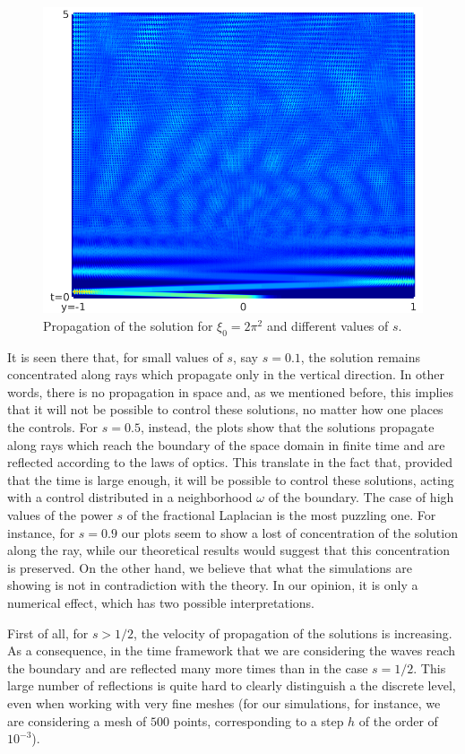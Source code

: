 \documentclass[10pt]{article}
\begin{document}
\begin{figure}[!h]
\begin{minipage}{0.3\textwidth}
		\includegraphics[scale=0.35]{./figures/plot_frac_schrodinger1_09_1}
	\end{minipage}	
	\caption{Propagation of the solution for $\xi_0 = 2\pi^2$ and different values of $s$.}\label{plot_01}
\end{figure} 

It is seen there that, for small values of $s$, say $s=0.1$, the solution remains concentrated along rays which propagate only in the vertical direction. In other words, there is no propagation in space and, as we mentioned before, this implies that it will not be possible to control these solutions, no matter how one places the controls. For $s=0.5$, instead, the plots show that the solutions propagate along rays which reach the boundary of the space domain in finite time and are reflected according to the laws of optics. This translate in the fact that, provided that the time is large enough, it will be possible to control these solutions, acting  with a control distributed in a neighborhood $\omega$ of the boundary. The case of high values of the power $s$ of the fractional Laplacian is the most puzzling one. For instance, for $s=0.9$ our plots seem to show a lost of concentration of the solution along the ray, while our theoretical results would suggest that this concentration is preserved. On the other hand, we believe that what the simulations are showing is not in contradiction with the theory. In our opinion, it is only a numerical effect, which has two possible interpretations.

First of all, for $s>1/2$, the velocity of propagation of the solutions is increasing. As a consequence, in the time framework that we are considering the waves reach the boundary and are reflected many more times than in the case $s=1/2$. This large number of reflections is quite hard to clearly distinguish a the discrete level, even when working with very fine meshes (for our simulations, for instance, we are considering a mesh of $500$ points, corresponding to a step $h$ of the order of $10^{-3}$). 
			
\end{document}
